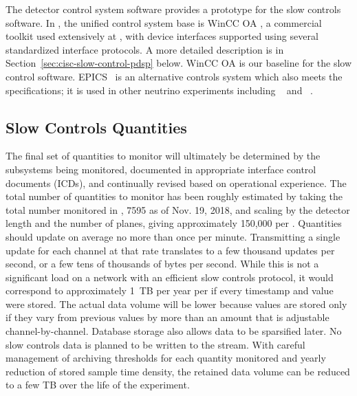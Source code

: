 The  detector control system software \cite{pdspdcs_proc} provides a prototype for %
the  slow controls software.
In , the unified control system base is WinCC OA \cite{winccoa}, a
commercial toolkit used extensively at , with device interfaces
supported using several standardized interface protocols. A more detailed description is in Section~\ref{sec:cisc-slow-control-pdsp} below.
WinCC OA is our baseline for the  slow control software.
EPICS~\cite{epics7} is an alternative controls system which also meets the specifications; it is used in other neutrino experiments including ~\cite{microboone} and ~\cite{Lukhanin:2012fp}. 


\subsection{Slow Controls Quantities}
\label{sec:fdgen-slow-cryo-quant}


The final set of quantities to monitor will ultimately be determined
by the subsystems being monitored, documented in
appropriate  interface control documents (ICDs), and continually revised based on operational
experience.  The total number of quantities to monitor has been roughly estimated by taking the total number monitored
in \cite{pdspdcs_proc}, 7595 as of Nov. 19, 2018, and scaling by the detector length and the number of planes, giving approximately 150,000 per .
Quantities should update on average no more than once per minute.
Transmitting a single update for each channel at that rate translates to a few thousand updates per second, or a few tens of thousands of bytes per second. While this is not a significant load on a network with an efficient slow controls protocol, it would correspond to approximately \SI{1}{TB} per year per  if every timestamp and value were stored.
The actual data volume will be lower %
because values are stored only if they vary from previous values by more than an amount that is adjustable channel-by-channel.
Database storage also allows data to be sparsified later.
No slow controls data is planned to be written to the  stream.
With careful management of archiving thresholds for each quantity monitored and yearly reduction of stored sample time density, the retained data volume can be reduced to a few TB over the life of the experiment.

